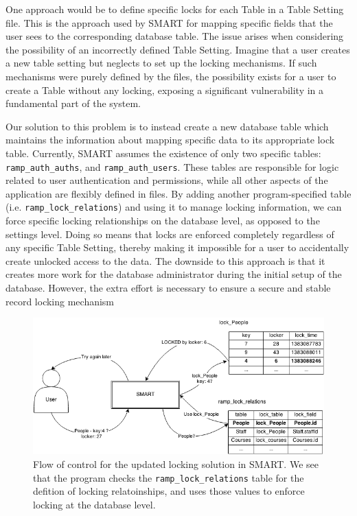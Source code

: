 \documentclass[12pt]{article}
\newcommand{\code}[1]{\texttt{#1}}
\begin{document}
One approach would be to define specific locks for each Table in a Table Setting file. This is the approach used by SMART for mapping specific fields that the user sees to the corresponding database table. The issue arises when considering the possibility of an incorrectly defined Table Setting. Imagine that a user creates a new table setting but neglects to set up the locking mechanisms. If such mechanisms were purely defined by the files, the possibility exists for a user to create a Table without any locking, exposing a significant vulnerability in a fundamental part of the system.

Our solution to this problem is to instead create a new database table which maintains the information about mapping specific data to its appropriate lock table. Currently, SMART assumes the existence of only two specific tables: \code{ramp\_auth\_auths}, and \code{ramp\_auth\_users}. These tables are responsible for logic related to user authentication and permissions, while all other aspects of the application are flexibly defined in files. By adding another program-specified table (i.e. \code{ramp\_lock\_relations}) and using it to manage locking information, we can force specific locking relationships on the database level, as opposed to the settings level. Doing so means that locks are enforced completely regardless of any specific Table Setting, thereby making it impossible for a user to accidentally create unlocked access to the data. The downside to this approach is that it creates more work for the database administrator during the initial setup of the database. However, the extra effort is necessary to ensure a secure and stable record locking mechanism

\newpage

\begin{center}
\begin{figure}[h]
    \vspace{-10pt}
    \centering
    \centerline{\includegraphics[width=6.5in]{diagrams/SecondLockDesign.png}}
    \begin{spacing}{1.0}\caption{Flow of control for the updated locking solution in SMART. We see that the program checks the \code{ramp\_lock\_relations} table for the defition of locking relatoinships, and uses those values to enforce locking at the database level.}\end{spacing}
    \vspace{-20pt}
\end{figure}
\end{center}
\end{document}
